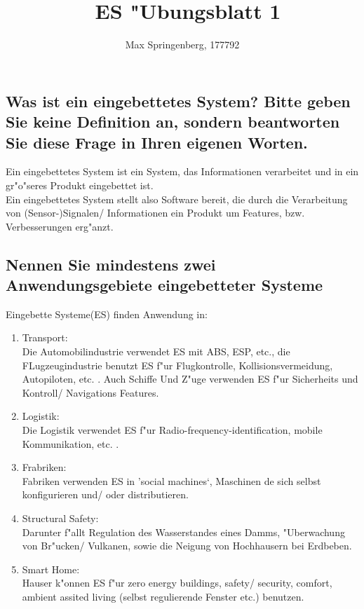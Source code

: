 \documentclass{article}
\author{Max Springenberg, 177792}
\title{\
    ES "Ubungsblatt 1
    }
\date{}
\begin{document}
\maketitle
\newpage

\subsection{Was ist ein eingebettetes System? Bitte geben Sie keine Definition 
    an, sondern beantworten Sie diese Frage in Ihren eigenen Worten.}

Ein eingebettetes System ist ein System, das Informationen verarbeitet und in 
    ein gr"o"seres Produkt eingebettet ist.\\
Ein eingebettetes System stellt also Software bereit, die durch die Verarbeitung
    von (Sensor-)Signalen/ Informationen ein Produkt um Features, bzw. 
    Verbesserungen erg"anzt.\\

\subsection{Nennen Sie mindestens zwei Anwendungsgebiete eingebetteter Systeme}

Eingebette Systeme(ES) finden Anwendung in:\\
\begin{enumerate}
    \item Transport:\\
          Die Automobilindustrie verwendet ES mit ABS, ESP, etc., die 
          FLugzeugindustrie benutzt ES f"ur Flugkontrolle, Kollisionsvermeidung,
          Autopiloten, etc. . Auch Schiffe Und Z"uge verwenden ES f"ur Sicherheits
          und Kontroll/ Navigations Features.\\
    \item Logistik:\\
          Die Logistik verwendet ES f"ur Radio-frequency-identification,
          mobile Kommunikation, etc. .\\
    \item Frabriken:\\
          Fabriken verwenden ES in 'social machines`, Maschinen de sich selbst 
          konfigurieren und/ oder distributieren.\\
    \item Structural Safety:\\
          Darunter f"allt Regulation des Wasserstandes eines Damms,
          "Uberwachung von Br"ucken/ Vulkanen, sowie die
          Neigung von Hochhausern bei Erdbeben.\\
    \item Smart Home:\\
          Hauser k"onnen ES f"ur zero energy buildings, safety/ security, 
          comfort, ambient assited living (selbst regulierende Fenster etc.)
          benutzen.\\
\end{enumerate}
\end{document}
